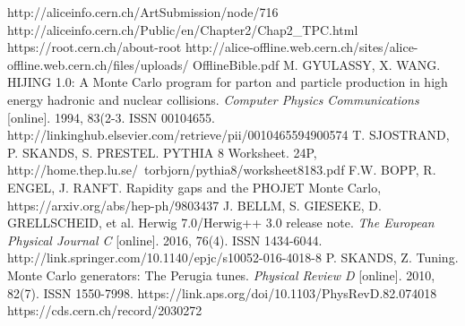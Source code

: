 \documentclass[thesismargins, thesislinespacing]{rnthesis}
\begin{document}
\begin{thebibliography}{}
http://aliceinfo.cern.ch/ArtSubmission/node/716
http://aliceinfo.cern.ch/Public/en/Chapter2/Chap2\_TPC.html
https://root.cern.ch/about-root 
http://alice-offline.web.cern.ch/sites/alice-offline.web.cern.ch/files/uploads/ \- OfflineBible.pdf
M. GYULASSY, X. WANG. HIJING 1.0: A Monte Carlo program for parton and particle production in high energy hadronic and nuclear collisions. \textit{Computer Physics Communications} [online]. 1994, 83(2-3. ISSN 00104655. http://linkinghub.elsevier.com/retrieve/pii/0010465594900574
T. SJOSTRAND, P. SKANDS, S. PRESTEL.  PYTHIA 8 Worksheet. 24P, http://home.thep.lu.se/~torbjorn/pythia8/worksheet8183.pdf
F.W. BOPP, R. ENGEL, J. RANFT.  Rapidity gaps and the PHOJET Monte Carlo, https://arxiv.org/abs/hep-ph/9803437
J. BELLM, S. GIESEKE, D. GRELLSCHEID, et al. Herwig 7.0/Herwig++ 3.0 release note. \textit{The European Physical Journal C} [online]. 2016, 76(4). ISSN 1434-6044. http://link.springer.com/10.1140/epjc/s10052-016-4018-8
P. SKANDS, Z. Tuning. Monte Carlo generators: The Perugia tunes. \textit{Physical Review D }[online]. 2010, 82(7). ISSN 1550-7998. https://link.aps.org/doi/10.1103/PhysRevD.82.074018
 https://cds.cern.ch/record/2030272
\end{thebibliography}
%
\end{document}
